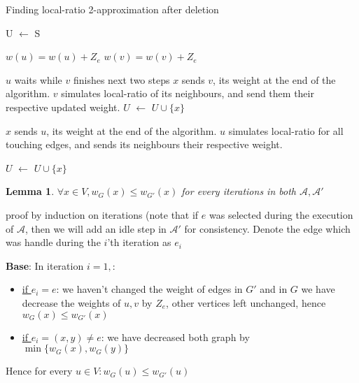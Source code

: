 \documentclass[11pt]{article}
\newcommand*\Let[2]{\State #1 $\gets$ #2}
\newtheorem{lemma}[theorem]{Lemma}
\begin{document}
\begin{algorithm}
  \caption{Finding local-ratio 2-approximation after deletion}
  \begin{algorithmic}[1]
        \Let{U}{S}
            \State {}
        \EndIf
        
        \State $w(u) = w(u) + Z_e$ 
        \State $w(v) = w(v) + Z_e$ 
                
        \State $u$ waits while $v$ finishes next two steps 
                \State $x$ sends $v$, its weight at the end of the algorithm.
            \EndFor
        \State $v$ simulates local-ratio of its neighbours, and send them their respective updated weight.
            \Let{$U$}{$U \cup \{x\}$}
        \EndIf
        
                \State $x$ sends $u$, its weight at the end of the algorithm.
            \EndFor
            \State $u$ simulates local-ratio for all touching edges, and sends its neighbours their respective weight.
        
                    \Let{$U$}{$U \cup \{x\}$}
                \EndIf
            \EndFor
        \EndIf
    \EndFunction
  \end{algorithmic}
\end{algorithm}

\begin{lemma}
\label{w_g_less_w_g_tag}
$\forall x \in V, w_G(x) \le w_{G'}(x)$ for every iterations in both \( \mathcal{A}, \mathcal{A'}\)
\end{lemma}
proof by induction on iterations (note that if $e$ was selected during the execution of $\mathcal{A}$, then we will add an idle step in $\mathcal{A'}$ for consistency.
Denote the edge which was handle during the $i$'th iteration as $e_i$

\textbf{Base}: In iteration $i=1,$:
\begin{itemize}
    \item \underline{if $e_i = e$}: we haven't changed the weight of edges in $G'$ and in $G$ we have decrease the weights of $u,v$ by $Z_e$, other vertices left unchanged, hence $w_G(x) \le w_{G'}(x)$
    \item \underline{if $e_i=(x,y) \ne e$}: we have decreased both graph by $\min\{w_G(x),w_G(y)\}$
\end{itemize}
Hence for every $u \in V: w_G(u) \le w_{G'}(u)$
\end{document}
